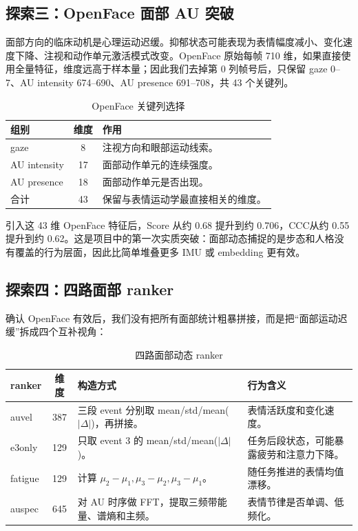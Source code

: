 \documentclass[UTF8,zihao=-4,fontset=windows]{ctexart}
\newcommand{\ccc}{CCC}
\begin{document}
\subsection{探索三：OpenFace 面部 AU 突破}

面部方向的临床动机是心理运动迟缓。抑郁状态可能表现为表情幅度减小、变化速度下降、注视和动作单元激活模式改变。OpenFace 原始每帧 710 维，如果直接使用全量特征，维度远高于样本量；因此我们去掉第 0 列帧号后，只保留 gaze 0--7、AU intensity 674--690、AU presence 691--708，共 43 个关键列。

\begin{table}[H]
  \centering
  \caption{OpenFace 关键列选择}
  \begin{tabularx}{0.88\linewidth}{l c X}
    \toprule
    组别 & 维度 & 作用 \\
    \midrule
    gaze & 8 & 注视方向和眼部运动线索。 \\
    AU intensity & 17 & 面部动作单元的连续强度。 \\
    AU presence & 18 & 面部动作单元是否出现。 \\
    \midrule
    合计 & 43 & 保留与表情运动学最直接相关的维度。 \\
    \bottomrule
  \end{tabularx}
\end{table}

引入这 43 维 OpenFace 特征后，Score 从约 0.68 提升到约 0.706，\ccc 从约 0.55 提升到约 0.62。这是项目中的第一次实质突破：面部动态捕捉的是步态和人格没有覆盖的行为层面，因此比简单堆叠更多 IMU 或 embedding 更有效。

\subsection{探索四：四路面部 ranker}

确认 OpenFace 有效后，我们没有把所有面部统计粗暴拼接，而是把“面部运动迟缓”拆成四个互补视角：

\begin{table}[H]
  \centering
  \caption{四路面部动态 ranker}
  \begin{tabularx}{\linewidth}{l c X X}
    \toprule
    ranker & 维度 & 构造方式 & 行为含义 \\
    \midrule
    auvel & 387 & 三段 event 分别取 mean/std/mean($|\Delta|$)，再拼接。 & 表情活跃度和变化速度。 \\
    e3only & 129 & 只取 event 3 的 mean/std/mean($|\Delta|$)。 & 任务后段状态，可能暴露疲劳和注意力下降。 \\
    fatigue & 129 & 计算 $\mu_2-\mu_1,\mu_3-\mu_2,\mu_3-\mu_1$。 & 随任务推进的表情均值漂移。 \\
    auspec & 645 & 对 AU 时序做 FFT，提取三频带能量、谱熵和主频。 & 表情节律是否单调、低频化。 \\
    \bottomrule
  \end{tabularx}
\end{table}
\end{document}
